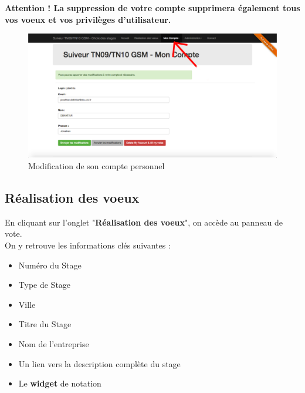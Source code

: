 \documentclass[a4paper,titlepage]{scrartcl}
\begin{document}
\textbf{Attention ! La suppression de votre compte supprimera également tous vos voeux et vos privilèges d'utilisateur.}\\

\begin{figure}[H]
	\vspace{-3mm}
	\begin{center}
		\includegraphics[scale=0.3]{Images/personal_infos_modif.png}
		\caption{Modification de son compte personnel}
	\end{center}
	\vspace{-1.5cm}
\end{figure}

\clearpage


\subsection{Réalisation des voeux}

En cliquant sur l'onglet "\textbf{Réalisation des voeux}", on accède au panneau de vote.\\

On y retrouve les informations clés suivantes :\\
\begin{itemize}
	\item Numéro du Stage
	
	\item Type de Stage
	
	\item Ville
	
	\item Titre du Stage
	
	\item Nom de l'entreprise
	
	\item Un lien vers la description complète du stage
	
	\item Le \textbf{widget} de notation\\
	
\end{itemize}
\end{document}
